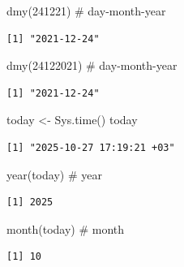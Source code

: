 \documentclass[
  letterpaper,
  DIV=11,
  numbers=noendperiod]{scrreprt}
\newenvironment{Shaded}{\begin{snugshade}}{\end{snugshade}}
\newcommand{\CommentTok}[1]{\textcolor[rgb]{0.37,0.37,0.37}{#1}}
\newcommand{\DecValTok}[1]{\textcolor[rgb]{0.68,0.00,0.00}{#1}}
\newcommand{\FunctionTok}[1]{\textcolor[rgb]{0.28,0.35,0.67}{#1}}
\newcommand{\NormalTok}[1]{\textcolor[rgb]{0.00,0.23,0.31}{#1}}
\newcommand{\OtherTok}[1]{\textcolor[rgb]{0.00,0.23,0.31}{#1}}
\begin{document}
\begin{Shaded}
\begin{Highlighting}[]
\FunctionTok{dmy}\NormalTok{(}\DecValTok{241221}\NormalTok{) }\CommentTok{\# day{-}month{-}year}
\end{Highlighting}
\end{Shaded}

\begin{verbatim}
[1] "2021-12-24"
\end{verbatim}

\begin{Shaded}
\begin{Highlighting}[]
\FunctionTok{dmy}\NormalTok{(}\DecValTok{24122021}\NormalTok{) }\CommentTok{\# day{-}month{-}year}
\end{Highlighting}
\end{Shaded}

\begin{verbatim}
[1] "2021-12-24"
\end{verbatim}

\begin{Shaded}
\begin{Highlighting}[]
\NormalTok{today }\OtherTok{\textless{}{-}} \FunctionTok{Sys.time}\NormalTok{()}
\NormalTok{today}
\end{Highlighting}
\end{Shaded}

\begin{verbatim}
[1] "2025-10-27 17:19:21 +03"
\end{verbatim}

\begin{Shaded}
\begin{Highlighting}[]
\FunctionTok{year}\NormalTok{(today) }\CommentTok{\# year}
\end{Highlighting}
\end{Shaded}

\begin{verbatim}
[1] 2025
\end{verbatim}

\begin{Shaded}
\begin{Highlighting}[]
\FunctionTok{month}\NormalTok{(today) }\CommentTok{\# month}
\end{Highlighting}
\end{Shaded}

\begin{verbatim}
[1] 10
\end{verbatim}
\end{document}
